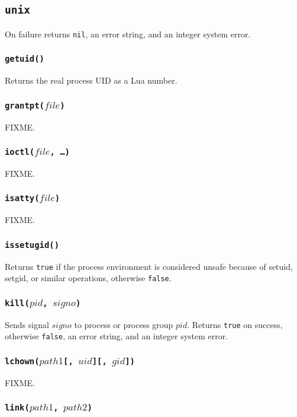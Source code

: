 \documentclass[11pt, oneside]{memoir}
\newcommand*{\true}[0]{\texttt{true}\xspace}
\newcommand*{\false}[0]{\texttt{false}\xspace}
\newcommand*{\nil}[0]{\texttt{nil}\xspace}
\newcommand*{\fn}[1]{\texttt{#1}\xspace}
\newcounter{toccols}
\newenvironment{Module}[1]{
	\subsection{\texttt{#1}}
	\addtocontents{toc}{
		\protect\begin{multicols}{\value{toccols}}
	}
}{
	\addtocontents{toc}{\protect\end{multicols}}
}
\begin{document}
\begin{Module}{unix}
On failure returns \nil, an error string, and an integer system error.

\subsubsection[\fn{getuid}]{\fn{getuid()}}

Returns the real process UID as a Lua number.

\subsubsection[\fn{grantpt}]{\fn{grantpt($file$)}}

FIXME.

\subsubsection[\fn{ioctl}]{\fn{ioctl($file$, \ldots)}}

FIXME.

\subsubsection[\fn{isatty}]{\fn{isatty($file$)}}

FIXME.

\subsubsection[\fn{issetugid}]{\fn{issetugid()}}

Returns \true if the process environment is considered unsafe because of setuid, setgid, or similar operations, otherwise \false.

\subsubsection[\fn{kill}]{\fn{kill($pid$, $signo$)}}

Sends signal $signo$ to process or process group $pid$. Returns \true on success, otherwise \false, an error string, and an integer system error.

\subsubsection[\fn{lchown}]{\fn{lchown($path1$[, $uid$][, $gid$])}}

FIXME.

\subsubsection[\fn{link}]{\fn{link($path1$, $path2$)}}


\end{Module}
\end{document}
